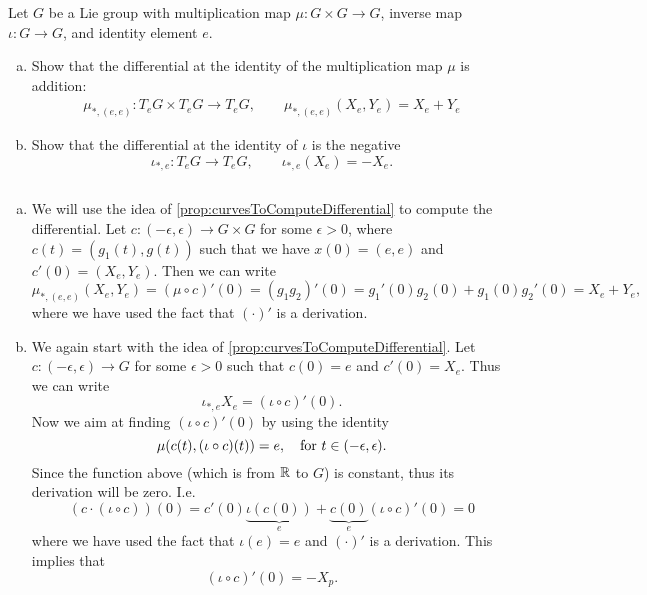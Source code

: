 \begin{problem}
	Let $ G $ be a Lie group with multiplication map $ \mu:G\times G \to G $, inverse map $ \iota: G \to G $, and identity element $ e $. 
	\begin{enumerate}[(a)]
		\item Show that the differential at the identity of the multiplication map $ \mu $ is addition:
		\begin{align*}
			\mu_{*,(e,e)}: T_eG \times T_eG \to T_e G, \qquad \mu_{*,(e,e)}(X_e,Y_e) = X_e + Y_e
		\end{align*}
		\item Show that the differential at the identity of $ \iota $ is the negative
		\[ \iota_{*,e}: T_eG \to T_eG, \qquad \iota_{*,e}(X_e) = -X_e. \]
	\end{enumerate}
\end{problem}
\begin{solution}
	$ \ $\\
	\begin{enumerate}[(a)]
		\item We will use the idea of \autoref{prop:curvesToComputeDifferential} to compute the differential. Let $ c:(-\epsilon,\epsilon) \to G\times G $ for some $ \epsilon>0 $, where $ c(t) = (g_1(t),g(t)) $ such that we have $ x(0) = (e,e) $ and $ c'(0)=(X_e,Y_e)$. Then we can write
		\[ \mu_{*,(e,e)} (X_e,Y_e) = (\mu \circ c)'(0) = (g_1g_2)'(0) = g_1'(0)g_2(0) + g_1(0)g_2'(0) = X_e + Y_e, \]
		where we have used the fact that $ (\cdot)' $ is a derivation.
		\item We again start with the idea of \autoref{prop:curvesToComputeDifferential}. Let $ c:(-\epsilon,\epsilon) \to G $ for some $ \epsilon>0 $ such that $ c(0) = e $ and $ c'(0) = X_e $. Thus we can write
		\[ \iota_{*,e} X_e = (\iota \circ c)'(0). \]
		Now we aim at finding $ (\iota \circ c)'(0) $ by using the identity
		\[ \mu(c(t), (\iota \circ c)(t)) = e, \quad \text{for $ t\in (-\epsilon,\epsilon) $}. \]
		Since the function above (which is from $ \mathbb{R} $ to $ G $) is constant, thus its derivation will be zero. I.e.
		\[ (c \cdot (\iota\circ c))(0) = c'(0)\underbrace{\iota(c(0))}_{e} + \underbrace{c(0)}_e(\iota\circ c)'(0) = 0 \]
		where we have used the fact that $ \iota(e) = e $ and $ (\cdot)' $ is a derivation. This implies that 
		\[ (\iota \circ c)'(0) = -X_p. \]
	\end{enumerate}
\end{solution}

